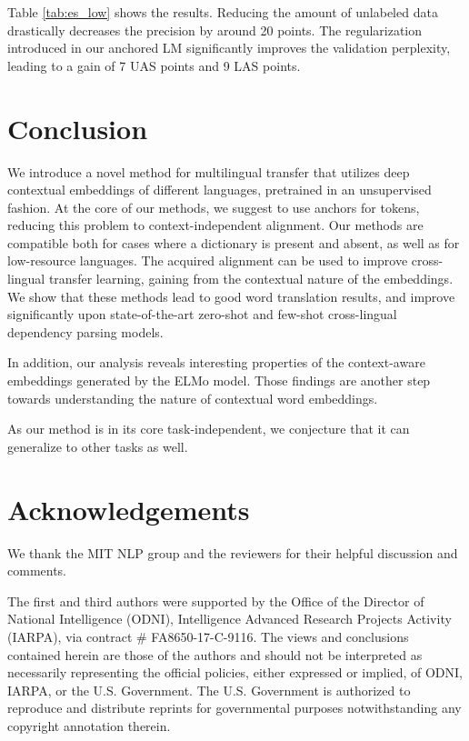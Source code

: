 \documentclass[11pt,a4paper]{article}
\begin{document}
Table \ref{tab:es_low} shows the results. Reducing the amount of unlabeled data drastically decreases the precision by around 20 points. The regularization introduced in our anchored LM significantly improves the validation perplexity, leading to a gain of 7 UAS points and 9 LAS points. 




 
\section{Conclusion}
We introduce a novel method for multilingual transfer that utilizes deep contextual embeddings of different languages, pretrained in an unsupervised fashion.
At the core of our methods, we suggest to use anchors for tokens, reducing this problem to context-independent alignment. Our methods are compatible both for cases where a dictionary is present and absent, as well as for low-resource languages. The acquired alignment can be used to improve cross-lingual transfer learning, gaining from the contextual nature of the embeddings. We show that these methods lead to good word translation results, and improve significantly upon state-of-the-art zero-shot and few-shot cross-lingual dependency parsing models. 

In addition, our analysis reveals interesting properties of the context-aware embeddings generated by the ELMo model. Those findings are another step towards understanding the nature of contextual word embeddings. 

As our method is in its core task-independent, we conjecture that it can generalize to other tasks as well.  

 \section*{Acknowledgements}
We thank the MIT NLP group and the reviewers for their helpful discussion and comments.

The first and third authors were supported by the Office of the Director of National Intelligence (ODNI), Intelligence Advanced Research Projects Activity (IARPA), via contract \# FA8650-17-C-9116. The views and conclusions contained herein are those of the authors and should not be interpreted as necessarily representing the official policies, either expressed or implied, of ODNI, IARPA, or the U.S. Government. The U.S. Government is authorized to reproduce and distribute reprints for governmental purposes notwithstanding any copyright annotation therein.
\end{document}
